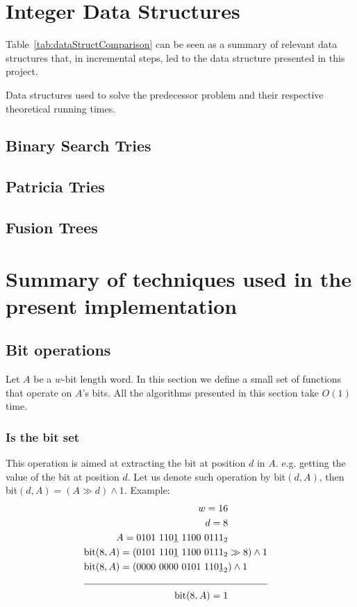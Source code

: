\section{Integer Data Structures}

Table~\ref{tab:dataStructComparison} can be seen as a summary of relevant data structures that, in incremental steps, led to the data structure presented in this project.

\begin{table}[H]
\centering

\caption[Data structure comparison]{Data structures used to solve the predecessor problem and their respective theoretical running times.}
\label{tab:dataStructComparison}
\end{table}

\subsection{Binary Search Tries}

\subsection{Patricia Tries}

\subsection{Fusion Trees}

\section{Summary of techniques used in the present implementation}

\subsection{Bit operations} \label{sec:bit}

Let $A$ be a $w$-bit length word. In this section we define a small set of functions that operate on $A$'s bits. All the algorithms presented in this section take $O(1)$ time.

\subsubsection{Is the bit set}

This operation is aimed at extracting the bit at position $d$ in $A$. e.g. getting the value of the bit at position $d$. Let us denote such operation by bit$(d, A)$, then bit$(d, A) = (A \gg d) \wedge 1$.
Example:
\begin{align*}
    w = 16\\
    d = 8\\
    A = 0101\ 110\underline{1}\ 1100\ 0111_2& \\
    \text{bit}(8,A) = (0101\ 110\underline{1}\ 1100\ 0111_2& \gg 8) \wedge 1 \\
    \text{bit}(8,A) = (0000\ 0000\ 0101\ 110\underline{1}_2&) \wedge 1 \\
    \cline{1-2}
    \text{bit}(8,A) = 1 &
\end{align*}

